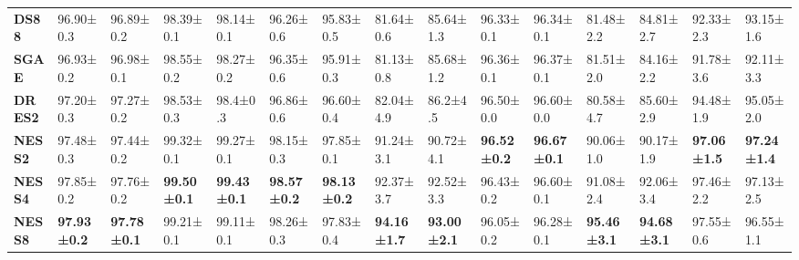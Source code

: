 \documentclass{article}
\begin{document}
\begin{table*}[tb]
\begin{center}
\begin{small}
\begin{sc}
{{\begin{tabular}{lllllllllllllll}
\textbf{DS88}& 96.90±0.3                       & 96.89±0.2                       & 98.39±0.1                      & 98.14±0.1                       & 96.26±0.6                      & 95.83±0.5                       & 81.64±0.6                      & 85.64±1.3                       & 96.33±0.1                      & 96.34±0.1                       & 81.48±2.2                    & 84.81±2.7                       & 92.33±2.3                      & 93.15±1.6   \\                   
\textbf{SGAE}& 96.93±0.2                      & 96.98±0.1                      & 98.55±0.2                      & 98.27±0.2                        & 96.35±0.6                      & 95.91±0.3                       & 81.13±0.8                       & 85.68±1.2                       & 96.36±0.1                     & 96.37±0.1                       & 81.51±2.0                      & 84.16±2.2                        & 91.78±3.6                       & 92.11±3.3                       \\
\midrule
\textbf{DRES2}& 97.20±0.3     & 97.27±0.2                       & 98.53±0.3                      & 98.4±0.3                       & 96.86±0.6                      & 96.60±0.4                       & 82.04±4.9                      & 86.2±4.5                       & 96.50±0.0                      & 96.60±0.0                      & 80.58±4.7                      & 85.60±2.9                       & 94.48±1.9                     & 95.05±2.0    \\                   
\textbf{NESS2}& 97.48±0.3                      & 97.44±0.2                       & 99.32±0.1                      & 99.27±0.1                        & 98.15±0.3                       & 97.85±0.1                       & 91.24±3.1                      & 90.72±4.1                        & \textbf{96.52±0.2}             & \textbf{96.67±0.1}              & 90.06±1.0                       & 90.17±1.9                       & \textbf{97.06±1.5}             & \textbf{97.24±1.4}  \\            
\textbf{NESS4}& 97.85±0.2                      & 97.76±0.2                       & \textbf{99.50±0.1}              & \textbf{99.43±0.1}              & \textbf{98.57±0.2}              & \textbf{98.13±0.2}              & 92.37±3.7                     & 92.52±3.3                       & 96.43±0.2                      & 96.60±0.1                       & 91.08±2.4                      & 92.06±3.4                       & 97.46±2.2                      & 97.13±2.5                      \\
\textbf{NESS8}& \textbf{97.93±0.2}             & \textbf{97.78±0.1}              & 99.21±0.1                      & 99.11±0.1                       & 98.26±0.3                      & 97.83±0.4                       & \textbf{94.16±1.7}             & \textbf{93.00±2.1}               & 96.05±0.2                      & 96.28±0.1                       & \textbf{95.46±3.1}             & \textbf{94.68±3.1}              & 97.55±0.6                      & 96.55±1.1     \\
\bottomrule


\end{tabular}}}
\end{sc}
\end{small}
\end{center}
\end{table*}
\end{document}
